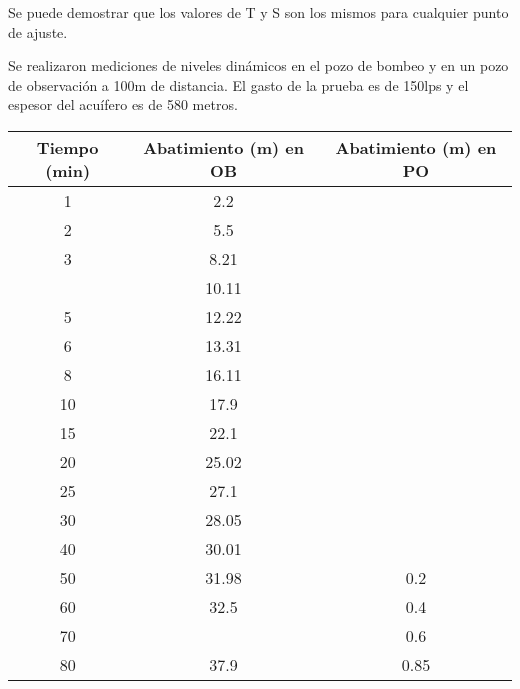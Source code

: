 Se puede demostrar que los valores de T y S son los mismos para cualquier punto de ajuste.
\begin{example}
    Se realizaron mediciones de niveles dinámicos en el pozo de bombeo y en un pozo de observación a 100m de distancia. El gasto de la prueba es de 150lps y el espesor del acuífero es de 580 metros.
    \begin{longtable}[c]{@{}ccc@{}}
        \toprule
        Tiempo (min) & Abatimiento (m) en OB & Abatimiento (m) en PO \\* \midrule
        \endfirsthead
        \endhead
        \bottomrule
        \endfoot
        \endlastfoot
        1            & 2.2                   &                       \\
        2            & 5.5                   &                       \\
        3            & 8.21                  &                       \\
                     & 10.11                 &                       \\
        5            & 12.22                 &                       \\
        6            & 13.31                 &                       \\
        8            & 16.11                 &                       \\
        10           & 17.9                  &                       \\
        15           & 22.1                  &                       \\
        20           & 25.02                 &                       \\
        25           & 27.1                  &                       \\
        30           & 28.05                 &                       \\
        40           & 30.01                 &                       \\
        50           & 31.98                 & 0.2                   \\
        60           & 32.5                  & 0.4                   \\
        70           &                       & 0.6                   \\
        80           & 37.9                  & 0.85                  \\

\end{longtable}
\end{example}

